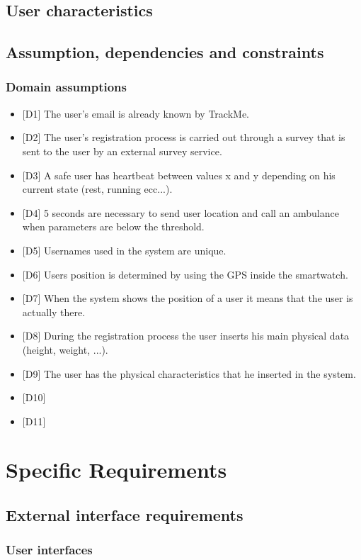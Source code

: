 \documentclass{article}
\begin{document}
\subsection{User characteristics}
\subsection{Assumption, dependencies and constraints}
\subsubsection{Domain assumptions}
\begin{itemize}
	\item {[D1]} The user's email is already known by TrackMe.
	\item {[D2]} The user's registration process is carried out through a survey that is sent to the user by an external survey service. 
	\item {[D3]} A safe user has heartbeat between values x and y depending on his current state (rest, running ecc...).
	\item {[D4]} 5 seconds are necessary to send user location and call an ambulance when parameters are below the threshold.
	\item {[D5]} Usernames used in the system are unique.
	\item {[D6]} Users position is determined by using the GPS inside the smartwatch.
	\item {[D7]} When the system shows the position of a user it means that the user is
actually there.
	\item {[D8]} During the registration process the user inserts his main physical data (height, weight, ...).
	\item {[D9]} The user has the physical characteristics that he inserted in the system.
	\item {[D10]}
	\item {[D11]}
\end{itemize}
\section{Specific Requirements}
\subsection{External interface requirements}
\subsubsection{User interfaces}
\end{document}
